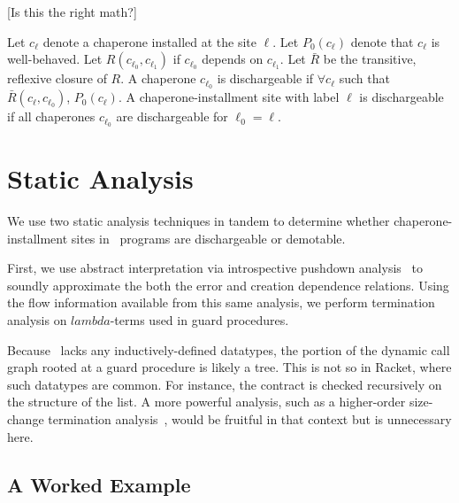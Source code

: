 \documentclass{sigplanconf}
\begin{document}
[Is this the right math?]

Let $c_\ell$ denote a chaperone installed at the site $\ell$.
Let $P_0(c_\ell)$ denote that $c_\ell$ is well-behaved.
Let $R(c_{\ell_0},c_{\ell_1})$ if $c_{\ell_0}$ depends on $c_{\ell_1}$.
Let $\bar{R}$ be the transitive, reflexive closure of $R$.
A chaperone $c_{\ell_0}$ is dischargeable if $\forall c_\ell$ such that $\bar{R}(c_\ell,c_{\ell_0})$, $P_0(c_\ell)$.
A chaperone-installment site with label $\ell$ is dischargeable if all chaperones $c_{\ell_0}$ are dischargeable for $\ell_0=\ell$.

\section{Static Analysis}

We use two static analysis techniques in tandem to determine whether chaperone-installment sites in \chapcalc\ programs are dischargeable or demotable.

First, we use abstract interpretation via introspective pushdown analysis~\cite{earl2012introspective} to soundly approximate the both the error and creation dependence relations.
Using the flow information available from this same analysis, we perform termination analysis on $lambda$-terms used in guard procedures.

Because \chapcalc\ lacks any inductively-defined datatypes, the portion of the dynamic call graph rooted at a guard procedure is likely a tree.
This is not so in Racket, where such datatypes are common.
For instance, the  contract is checked recursively on the structure of the list.
A more powerful analysis, such as a higher-order size-change termination analysis~\cite{sereni2007termination}, would be fruitful in that context but is unnecessary here.

\subsection{A Worked Example}
\end{document}
